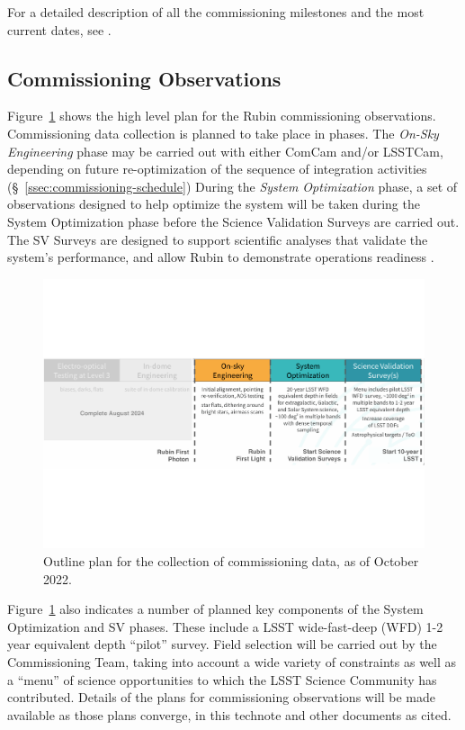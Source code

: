For a detailed description of all the commissioning milestones and the most current dates, see .


\subsection{Commissioning Observations}
\label{ssec:commissioning-observations}

Figure~\ref{fig:commissioning} shows the high level plan for the Rubin commissioning observations. 
Commissioning data collection is planned to take place in phases.
The \textit{On-Sky Engineering} phase may be carried out with either ComCam and/or LSSTCam, depending on future re-optimization of the sequence of integration activities (\S~\ref{ssec:commissioning-schedule})
During the \textit{System Optimization} phase,  a set of observations designed to help optimize the system will be taken during the System Optimization phase before the Science Validation Surveys are carried out. 
The SV Surveys are designed to support scientific analyses that validate the system's performance, and allow Rubin to demonstrate operations readiness .

\begin{figure}[htb]
\centering
\includegraphics[width=0.95\linewidth]{figures/commissioning-plan}
\caption{Outline plan for the collection of commissioning data, as of October 2022.}
\label{fig:commissioning}
\end{figure}

Figure~\ref{fig:commissioning} also indicates a number of planned key components of the System Optimization and SV phases.
These include a LSST wide-fast-deep (WFD) 1-2 year equivalent depth ``pilot'' survey.
Field selection will be carried out by the Commissioning Team, taking into account a wide variety of constraints as well as a ``menu'' of science opportunities to which the LSST Science Community has contributed.
Details of the plans for commissioning observations will be made available as those plans converge, in this technote and other documents as cited.